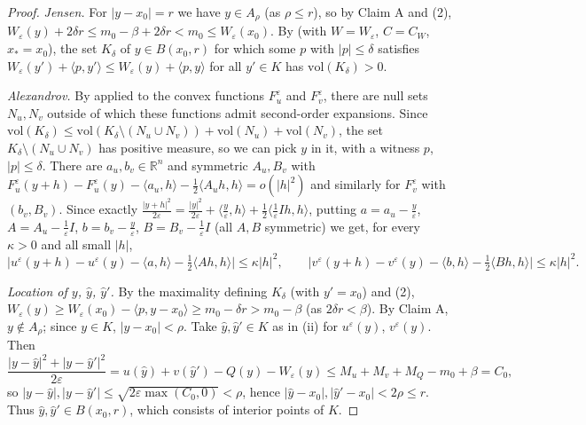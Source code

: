 \begin{proof}
\emph{Jensen.} For $|y-x_0|=r$ we have $y\in A_\rho$ (as $\rho\le r$), so by Claim A and (2), $W_\varepsilon(y)+2\delta r\le m_0-\beta+2\delta r<m_0\le W_\varepsilon(x_0)$. By  (with $W=W_\varepsilon$, $C=C_W$, $x_*=x_0$), the set $K_\delta$ of $y\in B(x_0,r)$ for which some $p$ with $|p|\le\delta$ satisfies $W_\varepsilon(y')+\langle p,y'\rangle\le W_\varepsilon(y)+\langle p,y\rangle$ for all $y'\in K$ has $\mathrm{vol}(K_\delta)>0$.

\emph{Alexandrov.} By  applied to the convex functions $F_u^\varepsilon$ and $F_v^\varepsilon$, there are null sets $N_u,N_v$ outside of which these functions admit second-order expansions. Since $\mathrm{vol}(K_\delta)\le\mathrm{vol}(K_\delta\setminus(N_u\cup N_v))+\mathrm{vol}(N_u)+\mathrm{vol}(N_v)$, the set $K_\delta\setminus(N_u\cup N_v)$ has positive measure, so we can pick $y$ in it, with a witness $p$, $|p|\le\delta$. There are $a_u,b_v\in\mathbb R^n$ and symmetric $A_u,B_v$ with $F_u^\varepsilon(y+h)-F_u^\varepsilon(y)-\langle a_u,h\rangle-\frac12\langle A_uh,h\rangle=o(|h|^2)$ and similarly for $F_v^\varepsilon$ with $(b_v,B_v)$. Since exactly $\frac{|y+h|^2}{2\varepsilon}=\frac{|y|^2}{2\varepsilon}+\langle\frac y\varepsilon,h\rangle+\frac12\langle\frac1\varepsilon Ih,h\rangle$, putting $a=a_u-\frac y\varepsilon$, $A=A_u-\frac1\varepsilon I$, $b=b_v-\frac y\varepsilon$, $B=B_v-\frac1\varepsilon I$ (all $A,B$ symmetric) we get, for every $\kappa>0$ and all small $|h|$,
\[
\bigl|u^\varepsilon(y+h)-u^\varepsilon(y)-\langle a,h\rangle-\tfrac12\langle Ah,h\rangle\bigr|\le\kappa|h|^2,\qquad \bigl|v^\varepsilon(y+h)-v^\varepsilon(y)-\langle b,h\rangle-\tfrac12\langle Bh,h\rangle\bigr|\le\kappa|h|^2. \tag{4}
\]

\emph{Location of $y$, $\hat y$, $\hat y'$.} By the maximality defining $K_\delta$ (with $y'=x_0$) and (2), $W_\varepsilon(y)\ge W_\varepsilon(x_0)-\langle p,y-x_0\rangle\ge m_0-\delta r>m_0-\beta$ (as $2\delta r<\beta$). By Claim A, $y\notin A_\rho$; since $y\in K$, $|y-x_0|<\rho$. Take $\hat y,\hat y'\in K$ as in (ii) for $u^\varepsilon(y)$, $v^\varepsilon(y)$. Then
\[
\frac{|y-\hat y|^2+|y-\hat y'|^2}{2\varepsilon}=u(\hat y)+v(\hat y')-Q(y)-W_\varepsilon(y)\le M_u+M_v+M_Q-m_0+\beta=C_0,
\]
so $|y-\hat y|,|y-\hat y'|\le\sqrt{2\varepsilon\max(C_0,0)}<\rho$, hence $|\hat y-x_0|,|\hat y'-x_0|<2\rho\le r$. Thus $\hat y,\hat y'\in B(x_0,r)$, which consists of interior points of $K$.


\end{proof}
